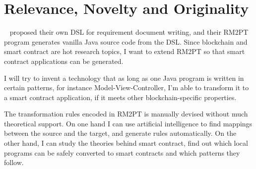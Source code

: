 





\section{Relevance, Novelty and Originality}

~\cite{yang2019automated} proposed their own DSL for requirement document writing,  and their RM2PT program generates vanilla Java source code from the DSL. Since blockchain and smart contract are hot research topics, I want to extend RM2PT so that smart contract applications can be generated.


I will try to invent a technology that as long as one Java program is written in certain patterns, for instance Model-View-Controller, I'm able to transform it to a smart contract application, if it meets other blockchain-specific properties.

The transformation rules encoded in RM2PT is manually devised without much theoretical support. On one hand I can use artificial intelligence to find mappings between the source and the target, and generate rules automatically. On the other hand, I can study the theories behind smart contract, find out which local programs can be safely converted to smart contracts and which patterns they follow.



